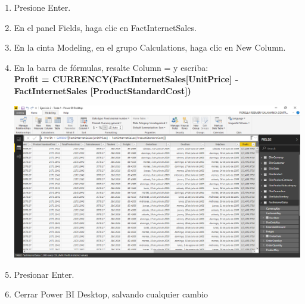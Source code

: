 \begin{enumerate}[1.]
    \item Presione Enter.
    \item En el panel Fields, haga clic en FactInternetSales.
    \item En la cinta Modeling, en el grupo Calculations, haga clic en New Column.
    \item En la barra de fórmulas, resalte Column = y escriba: \\

\textbf{Profit = CURRENCY(FactInternetSales[UnitPrice] - \\
FactInternetSales [ProductStandardCost])}\\

	\begin{center}
	\includegraphics[width=17cm]{./Imagenes/Ejercicio2-Tarea1/8}
	\end{center}	

    \item Presionar Enter.
    \item Cerrar Power BI Desktop, salvando cualquier cambio

\end{enumerate}
